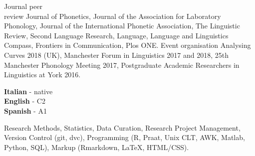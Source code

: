 \documentclass[9pt]{developercv} %
\begin{document}


\begin{entrylist}
	\entry
		{Journal peer \\ review}
		{\textnormal{Journal of Phonetics, Journal of the Association for Laboratory Phonology, Journal of the International Phonetic Association, The Linguistic Review, Second Language Research, Language, Language and Linguistics Compass, Frontiers in Communication, Plos ONE.}}
		{}
		{}
	\entry
		{Event organisation}
		{\textnormal{Analysing Curves 2018 (UK), Manchester Forum in Linguistics 2017 and 2018, 25th Manchester Phonology Meeting 2017, Postgraduate Academic Researchers in Linguistics at York 2016.}}
		{}
		{}
\end{entrylist}


\begin{minipage}[t]{0.3\textwidth}
	\vspace{-\baselineskip} %


	\textbf{Italian} - native\\
	\textbf{English} - C2 \\
	\textbf{Spanish} - A1
\end{minipage}
\begin{minipage}[t]{0.6\textwidth}
	\vspace{-\baselineskip} %


	Research Methods, Statistics, Data Curation, Research Project Management, Version Control (git, dvc), Programming (R, Praat, Unix CLT, AWK, Matlab, Python, SQL), Markup (Rmarkdown, \LaTeX{}, HTML/CSS).
\end{minipage}


\end{document}
